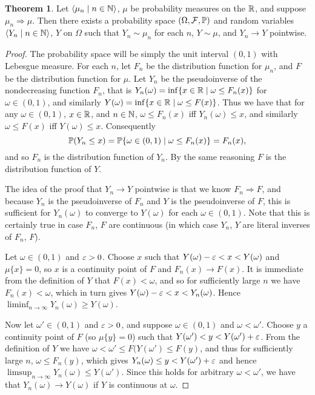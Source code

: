 \documentclass[leqno]{article}
\theoremstyle{definition}
\newtheorem{theorem}{Theorem}[section]
\newcommand{\bldset}[2]{\{{#1}\mid{#2}\}}
\newcommand{\bldseq}[2]{\langle{#1}\mid{#2}\rangle}
\begin{document}
\begin{theorem}
Let $\bldseq{\mu_n}{n \in \N}$, $\mu$ be probability measures on the $\R$, and suppose $\mu_n \Rightarrow \mu$. Then there exists a probability space $(\Omega, \mathcal F, \P)$ and random variables $\bldseq{Y_n}{n \in \N}$, $Y$ on $\Omega$ such that $Y_n \sim \mu_n$ for each $n$, $Y \sim \mu$, and $Y_n \rightarrow Y$ pointwise.
\end{theorem}

\begin{proof}
The probability space will be simply the unit interval $(0,1)$ with Lebesgue measure. For each $n$, let $F_n$ be the distribution function for $\mu_n$, and $F$ be the distribution function for $\mu$. Let $Y_n$ be the pseudoinverse of the nondecreasing function $F_n$, that is $Y_n(\omega) = \inf \bldset{x \in \R}{\omega \le F_n(x)}$ for $\omega \in (0,1)$, and similarly $Y(\omega) = \inf \bldset{x \in \R}{\omega \le F(x)}$. Thus we have that for any $\omega \in (0,1)$, $x \in \R$, and $n \in \N$, $\omega \le F_n(x)$ iff $Y_n(\omega) \le x$, and similarly $\omega \le F(x)$ iff $Y(\omega) \le x$. Consequently
\[ \P(Y_n \le x) = \P \bldset{\omega \in (0,1)}{\omega \le F_n(x)} = F_n(x), \]
and so $F_n$ is the distribution function of $Y_n$. By the same reasoning $F$ is the distribution function of $Y$.

The idea of the proof that $Y_n \rightarrow Y$ pointwise is that we know $F_n \Rightarrow F$, and because $Y_n$ is the pseudoinverse of $F_n$ and $Y$ is the pseudoinverse of $F$, this is sufficient for $Y_n(\omega)$ to converge to $Y(\omega)$ for each $\omega \in (0,1)$. Note that this is certainly true in case $F_n$, $F$ are continuous (in which case $Y_n$, $Y$ are literal inverses of $F_n$, $F$).

Let $\omega \in (0,1)$ and $\eps > 0$. Choose $x$ such that $Y(\omega) - \eps < x < Y(\omega)$ and $\mu \{x\} = 0$, so $x$ is a continuity point of $F$ and $F_n(x) \rightarrow F(x)$. It is immediate from the definition of $Y$ that $F(x) < \omega$, and so for sufficiently large $n$ we have $F_n(x) < \omega$, which in turn gives $Y(\omega) - \eps < x < Y_n(\omega)$. Hence $\liminf_{n \rightarrow \infty} Y_n(\omega) \ge Y(\omega)$.

Now let $\omega' \in (0,1)$ and $\eps > 0$, and suppose $\omega \in (0,1)$ and $\omega < \omega'$. Choose $y$ a continuity point of $F$ (so $\mu \{y\} = 0$) such that $Y(\omega') < y < Y(\omega') + \eps$. From the definition of $Y$ we have $\omega < \omega' \le F(Y(\omega') \le F(y)$, and thus for sufficiently large $n$, $\omega \le F_n(y)$, which gives $Y_n(\omega) \le y < Y(\omega') + \eps$ and hence $\limsup_{n \rightarrow \infty} Y_n(\omega) \le Y(\omega')$. Since this holds for arbitrary $\omega < \omega'$, we have that $Y_n(\omega) \rightarrow Y(\omega)$ if $Y$ is continuous at $\omega$.


\end{proof}
\end{document}
